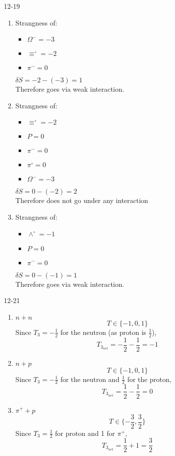 \documentclass{2620hw}
\begin{document}
\begin{enumerate}
\item [12-19]
\begin{enumerate}
	\item Strangness of:
	\begin{itemize}
		\item $\Omega^- = -3$ 
		\item $\equiv^{\circ} = -2$ 
		\item $\pi^{-} = 0$ 
	\end{itemize}
	$\delta S = -2 - (-3) = 1$\\
	Therefore goes via weak interaction.

	\item Strangness of:
	\begin{itemize}
		\item $\equiv^{\circ} = -2$ 
		\item $P = 0$ 
		\item $\pi^{-} = 0$ 
		\item $\pi^{\circ} = 0$ 
		\item $\Omega^- = -3$ 
	\end{itemize}
	$\delta S = 0 - (-2) = 2$\\
	Therefore does not go under any interaction

	\item Strangness of:
	\begin{itemize}
		\item $\wedge^{\circ} = -1$ 
		\item $P = 0$ 
		\item $\pi^{-} = 0$ 
	\end{itemize}
	$\delta S = 0 - (-1) = 1$\\
	Therefore goes via weak interaction.
\end{enumerate}

\item [12-21]
\begin{enumerate}
	\item $n+n$\\
	\[
		T \in \{-1, 0, 1\}
	\]
	Since $T_3 = -\frac{1}{2}$ for the neutron (as proton is $\frac{1}{2}$),
	\[
		T_{3_{net}} = -\frac{1}{2}-\frac{1}{2} = -1
	\]
	
	\item $n+p$
	\[
		T \in \{-1, 0, 1\}
	\]
	Since $T_3 = -\frac{1}{2}$ for the neutron and $\frac{1}{2}$ for the proton,
	\[
		T_{3_{net}} = \frac{1}{2}-\frac{1}{2} = 0
	\]

	\item $\pi^+ +p$
	\[
		T \in \{-\frac{3}{2}, \frac{3}{2}\}
	\]
	Since $T_3 = \frac{1}{2}$ for proton and 1 for $\pi^+$,
	\[
		T_{3_{net}} = \frac{1}{2}+1 = \frac{3}{2}
	\]


\end{enumerate}
\end{enumerate}
\end{document}
